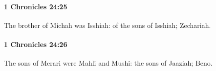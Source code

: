		\paragraph{1 Chronicles 24:25} %
			\label{1CHRONICLES-24-25}

			The brother of Michah was Isshiah: of the sons of Isshiah; Zechariah.


		\paragraph{1 Chronicles 24:26} %
			\label{1CHRONICLES-24-26}

			The sons of Merari were Mahli and Mushi: the sons of Jaaziah; Beno.


